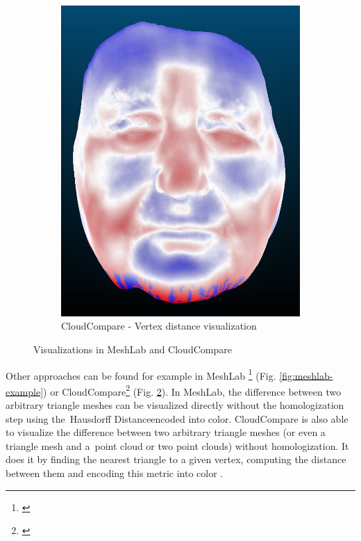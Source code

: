 \begin{figure}[h]
\begin{subfigure}{0.3\textwidth}
	\includegraphics[width=\textwidth]{./img/cloudcompare-example01.PNG}
    \caption[CloudCompare - Vertex distance visualization]{CloudCompare - Vertex distance visualization}
    \label{fig:cloudcompare-example}
	\end{subfigure}
\caption{Visualizations in MeshLab and CloudCompare}
\end{figure}

Other approaches can be found for example in MeshLab \footnote{\citet{MeshLab}} (Fig. \ref{fig:meshlab-example}) or CloudCompare\footnote{\citet{CloudCmp}} (Fig. \ref{fig:cloudcompare-example}). In MeshLab, the difference between two arbitrary triangle meshes can be visualized directly without the homologization step using the~Hausdorff Distance\footnotemark encoded into color. CloudCompare is also able to visualize the difference between two arbitrary triangle meshes (or even a triangle mesh and a~point cloud or two point clouds) without homologization. It does it by finding the nearest triangle to a given vertex, computing the distance between them and encoding this metric into color \citep{CloudCmpDistance}.

